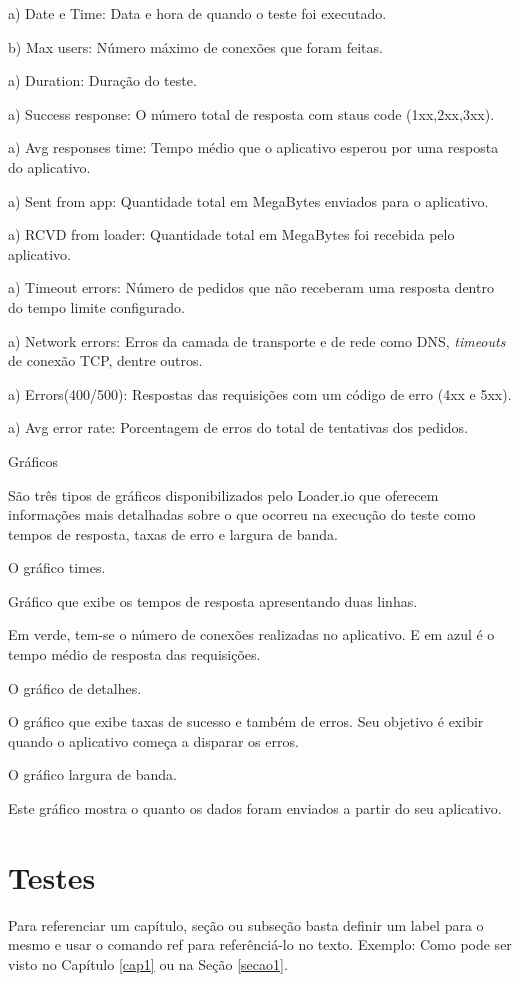   \begin{compactitem}
    \item[a)] Date e Time: Data e hora de quando o teste foi executado.
    \item[b)] Max users: Número máximo de conexões que foram feitas.
    \item[a)] Duration:  Duração do teste.
    \item[a)] Success response: O número total de resposta com staus code (1xx,2xx,3xx).
    \item[a)] Avg responses time: Tempo médio que o aplicativo esperou por uma resposta do aplicativo.
    \item[a)] Sent from app: Quantidade total em MegaBytes enviados para o aplicativo.
    \item[a)] RCVD from loader: Quantidade total em MegaBytes foi recebida pelo aplicativo.
    \item[a)] Timeout errors: Número de pedidos que não receberam uma resposta dentro do tempo limite configurado.
    \item[a)] Network errors: Erros da camada de transporte e de rede como \ac{DNS}, \textit{timeouts} de conexão TCP, dentre outros.
    \item[a)] Errors(400/500): Respostas das requisições com um código de erro (4xx e 5xx).
    \item[a)] Avg error rate: Porcentagem de erros do total de tentativas dos pedidos.
  \end{compactitem}

  Gráficos
  
  São três tipos de gráficos disponibilizados pelo Loader.io que oferecem informações mais detalhadas 
  sobre o que ocorreu na execução do teste como tempos de resposta, taxas de erro e largura de banda.
  
  O gráfico times.
  
  Gráfico que exibe os tempos de resposta apresentando duas linhas.
  
  Em verde, tem-se o número de conexões realizadas no aplicativo. E em azul é o tempo médio de resposta das
  requisições.
  
  O gráfico de detalhes.
  
  O gráfico que exibe taxas de sucesso e também de erros. Seu objetivo é exibir quando o aplicativo
  começa a disparar os erros.
  
  O gráfico largura de banda.
  
  Este gráfico mostra o quanto os dados foram enviados a partir do seu aplicativo.


\section{Testes}

  Para referenciar um capítulo, seção ou subseção basta definir um label para o mesmo e usar o comando ref para referênciá-lo
  no texto. Exemplo: Como pode ser visto no Capítulo \ref{cap1} ou na Seção \ref{secao1}.